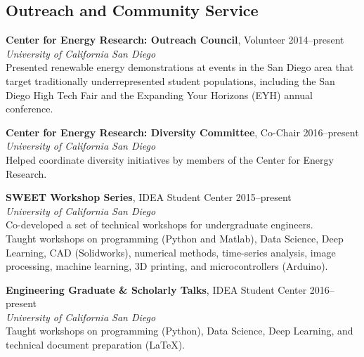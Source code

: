 \documentclass[10pt]{res}
\begin{document}
\begin{resume}
\section{Outreach and Community Service}
\vspace{0.1in}
%

\textbf{Center for Energy Research: Outreach Council}, Volunteer \hfill 2014--present \\
\textit{University of California San Diego} \\
Presented renewable energy demonstrations at events in the San Diego area that
target traditionally underrepresented student populations, including the San Diego
High Tech Fair and the Expanding Your Horizons (EYH) annual conference.

\textbf{Center for Energy Research: Diversity Committee}, Co-Chair \hfill 2016--present \\
\textit{University of California San Diego} \\
Helped coordinate diversity initiatives by members of the Center for Energy Research.

\textbf{SWEET Workshop Series}, IDEA Student Center \hfill 2015--present \\
\textit{University of California San Diego} \\
Co-developed a set of technical workshops for undergraduate engineers. \\
Taught workshops on programming (Python and Matlab), Data Science, Deep
Learning, CAD (Solidworks), numerical methods, time-series analysis, image
processing, machine learning, 3D printing, and microcontrollers (Arduino).

\textbf{Engineering Graduate \& Scholarly Talks}, IDEA Student Center \hfill 2016--present \\
\textit{University of California San Diego} \\
Taught workshops on programming (Python), Data Science, Deep Learning, and
technical document preparation (LaTeX).


\end{resume}
\end{document}
